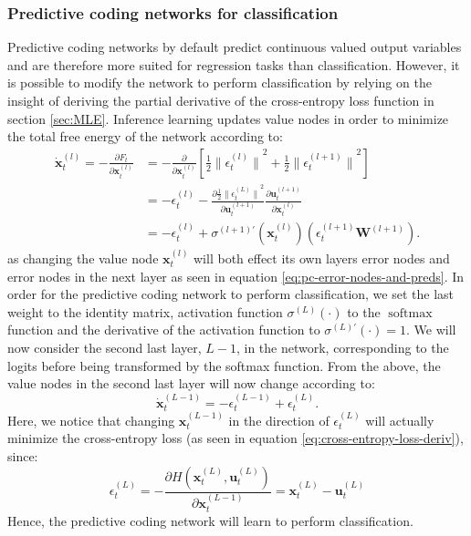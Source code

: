 \documentclass[a4paper,11pt]{article} %
\DeclareMathOperator{\softmax}{softmax}
\begin{document}
\subsubsection{Predictive coding networks for classification}
Predictive coding networks by default predict continuous valued output variables and are therefore more suited for regression tasks than classification. However, it is possible to modify the network to perform classification by relying on the insight of deriving the partial derivative of the cross-entropy loss function in section \ref{sec:MLE}. Inference learning updates value nodes in order to minimize the total free energy of the network according to:
\begin{equation}
  \begin{split}
  \dot{\mathbf{x}}_t^{(l)} = -\frac{\partial F_t}{\partial \mathbf{x}_t^{(l)}} & = - \frac{\partial }{\partial \mathbf{x}_t^{(l)}} \left[ \frac{1}{2} {\lVert \epsilon_t^{(l)} \rVert}^2 + \frac{1}{2} {\lVert \epsilon_t^{(l+1)} \rVert}^2  \right] \\
  & = -\epsilon_t^{(l)} - \frac{\partial \frac{1}{2} {\lVert \epsilon_t^{(L)} \rVert}^2}{\partial \mathbf{u}_t^{(l+1)}} \frac{\partial \mathbf{u}_t^{(l+1)}}{\partial \mathbf{x}_t^{(l)}} \\
  & = -\epsilon_{t}^{(l)}+\sigma^{(l+1)\prime}(\mathbf{x}_{t}^{(l)})(\epsilon_{t}^{(l+1)} \mathbf{W}^{(l+1)}).
  \end{split}
\end{equation}
as changing the value node $\mathbf{x}_t^{(l)}$ will both effect its own layers error nodes and error nodes in the next layer as seen in equation \ref{eq:pc-error-nodes-and-preds}. In order for the predictive coding network to perform classification, we set the last weight to the identity matrix, activation function $\sigma^{(L)}(\cdot)$ to the $\softmax$ function and the derivative of the activation function to $\sigma^{(L)\prime}(\cdot) = 1$. We will now consider the second last layer, $L-1$, in the network, corresponding to the logits before being transformed by the softmax function. From the above, the value nodes in the second last layer will now change according to:
\begin{equation}
  \dot{\mathbf{x}}_{t}^{(L-1)} = -\epsilon_{t}^{(L-1)} + \epsilon_{t}^{(L)}.
\end{equation}
Here, we notice that changing $\mathbf{x}_t^{(L-1)}$ in the direction of $\epsilon_{t}^{(L)}$ will actually minimize the cross-entropy loss (as seen in equation \ref{eq:cross-entropy-loss-deriv}), since:
\begin{equation}
  \epsilon_{t}^{(L)} = -\frac{\partial H(\mathbf{x}_t^{(L)}, \mathbf{u}_t^{(L)})}{\partial \mathbf{x}_t^{(L-1)}} = \mathbf{x}_t^{(L)} - \mathbf{u}_t^{(L)}
\end{equation}
Hence, the predictive coding network will learn to perform classification. 
\end{document}
